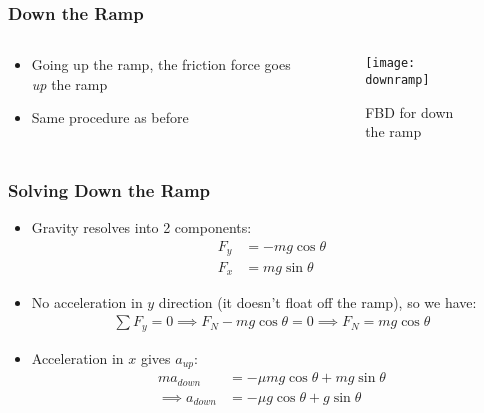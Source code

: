 \documentclass[aspectratio=169]{beamer}
\begin{document}
\begin{frame}
  \frametitle{Down the Ramp}
  \begin{columns}
    \begin{column}{0.5\textwidth}
      \begin{itemize}
      \item Going up the ramp, the friction force goes \emph{up} the ramp
      \item Same procedure as before
      \end{itemize}
    \end{column}
    \begin{column}{0.5\textwidth}
      \begin{figure}[H]
        \centering
        \texttt{[image: downramp]}
        \caption{FBD for down the ramp}
      \end{figure}
    \end{column}
  \end{columns}
\end{frame}

\begin{frame}
  \frametitle{Solving Down the Ramp}
  \begin{itemize}
  \item Gravity resolves into 2 components:
    \begin{align*}
      F_{y}&=-mg\cos\theta\\
      F_{x}&= mg\sin\theta
    \end{align*}
  \item No acceleration in $y$ direction (it doesn't float off the ramp), so we have:
    \begin{align*}
      \sum F_y=0\implies F_N-mg\cos\theta=0\implies F_N=mg\cos\theta
    \end{align*}
  \item Acceleration in $x$ gives $a_{up}$:
    \begin{align*}
      ma_{down}&=-\mu mg\cos\theta+mg\sin\theta\\
      \implies a_{down}&=-\mu g\cos\theta+g\sin\theta
    \end{align*}
  \end{itemize}
\end{frame}
\end{document}
